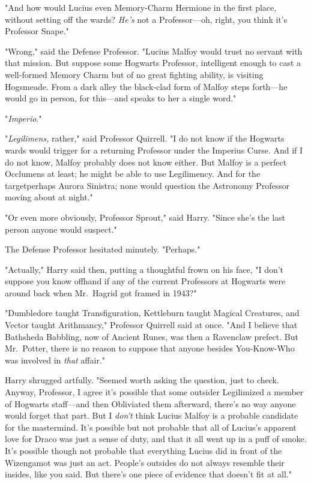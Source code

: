 "And how would Lucius even Memory-Charm Hermione in the first place, without
setting off the wards? \emph{He's} not a Professor---oh, right, you think it's
Professor Snape."

"Wrong," said the Defense Professor. "Lucius Malfoy would trust no servant with
that mission. But suppose some Hogwarts Professor, intelligent enough to cast a
well-formed Memory Charm but of no great fighting ability, is visiting
Hogsmeade. From a dark alley the black-clad form of Malfoy steps forth---he
would go in person, for this---and speaks to her a single word."

"\emph{Imperio}."

"\emph{Legilimens,} rather," said Professor Quirrell. "I do not know if the
Hogwarts wards would trigger for a returning Professor under the Imperius
Curse. And if I do not know, Malfoy probably does not know either. But Malfoy
is a perfect Occlumens at least; he might be able to use Legilimency. And for
the target{\el}perhaps Aurora Sinistra; none would question the Astronomy
Professor moving about at night."

"Or even more obviously, Professor Sprout," said Harry. "Since she's the last
person anyone would suspect."

The Defense Professor hesitated minutely. "Perhaps."

"Actually," Harry said then, putting a thoughtful frown on his face, "I don't
suppose you know offhand if any of the current Professors at Hogwarts were
around back when Mr.~Hagrid got framed in 1943?"

"Dumbledore taught Transfiguration, Kettleburn taught Magical Creatures, and
Vector taught Arithmancy," Professor Quirrell said at once. "And I believe that
Bathsheda Babbling, now of Ancient Runes, was then a Ravenclaw prefect. But
Mr.~Potter, there is no reason to suppose that anyone besides You-Know-Who was
involved in \emph{that} affair."

Harry shrugged artfully. "Seemed worth asking the question, just to check.
Anyway, Professor, I agree it's possible that some outsider Legilimized a
member of Hogwarts staff---and then Obliviated them afterward, there's no way
anyone would forget that part. But I \emph{don't} think Lucius Malfoy is a
probable candidate for the mastermind. It's possible but not probable that all
of Lucius's apparent love for Draco was just a sense of duty, and that it all
went up in a puff of smoke. It's possible though not probable that everything
Lucius did in front of the Wizengamot was just an act. People's outsides do not
always resemble their insides, like you said. But there's one piece of evidence
that doesn't fit at all."

